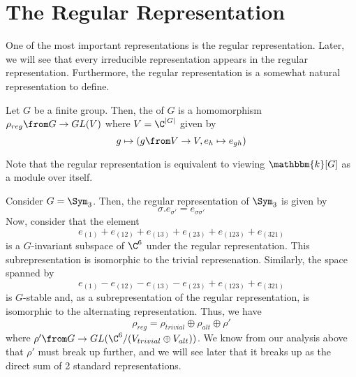 \documentclass[11pt,leqno,oneside]{amsbook}
\newcommand{\bbk}{\mathbbm{k}}
\numberwithin{thm}{section}
\begin{document}
\section{The Regular Representation}
One of the most important representations is the regular
representation. Later, we will see that every irreducible
representation appears in the regular representation. Furthermore, the
regular representation is a somewhat natural representation to define.
\begin{defn}
  Let \(G\) be a finite group. Then, the 
  of \(G\) is a homomorphism \(\rho_{reg} \from G \to GL(V)\) where \(V =
  \C^{|G|}\) given
  by \[
    g \mapsto (g \from V \to V, e_h \mapsto e_{gh}) 
  \]
\end{defn}
Note that the regular representation is equivalent to viewing
\(\bbk[G]\) as a module over itself.
\begin{example}
  Consider \(G = \Sym_3\). Then, the regular representation of
  \(\Sym_3\) is given by \[
    \sigma.e_{\sigma'} = e_{\sigma \sigma'}
  \]
  Now, consider that the element \[
    e_{(1)} + e_{(12)} + e_{(13)} + e_{(23)} + e_{(123)} + e_{(321)}
  \]
  is a \(G\)-invariant subspace of \(\C^6\) under the regular
  representation. This subrepresentation is isomorphic to the trivial
  represenation. Similarly, the space spanned by \[
    e_{(1)} - e_{(12)} - e_{(13)} - e_{(23)} + e_{(123)} + e_{(321)}
  \]
  is \(G\)-stable and, as a subrepresentation of the regular
  representation, is isomorphic to the alternating
  representation. Thus, we have \[
    \rho_{reg} = \rho_{trivial} \oplus \rho_{alt} \oplus \rho'
  \]
  where \(\rho' \from G \to GL(\C^6/(V_{trivial} \oplus
  V_{alt}))\). We know from our analysis above that \(\rho'\) must
  break up further, and we will see later that it breaks up as the
  direct sum of 2 standard representations.
\end{example}
\end{document}
